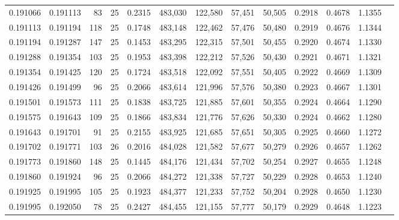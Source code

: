 \begin{tabular}{rrrrrrrrrrrrr}
0.191066 & 0.191113 &    83 &  25 &                                     0.2315 & 483,030 & 122,580 &  57,451 &  50,505 & 0.2918 & 0.4678 & 1.1355 \\
0.191113 & 0.191194 &   118 &  25 &                                     0.1748 & 483,148 & 122,462 &  57,476 &  50,480 & 0.2919 & 0.4676 & 1.1344 \\
0.191194 & 0.191287 &   147 &  25 &                                     0.1453 & 483,295 & 122,315 &  57,501 &  50,455 & 0.2920 & 0.4674 & 1.1330 \\
0.191288 & 0.191354 &   103 &  25 &                                     0.1953 & 483,398 & 122,212 &  57,526 &  50,430 & 0.2921 & 0.4671 & 1.1321 \\
0.191354 & 0.191425 &   120 &  25 &                                     0.1724 & 483,518 & 122,092 &  57,551 &  50,405 & 0.2922 & 0.4669 & 1.1309 \\
0.191426 & 0.191499 &    96 &  25 &                                     0.2066 & 483,614 & 121,996 &  57,576 &  50,380 & 0.2923 & 0.4667 & 1.1301 \\
0.191501 & 0.191573 &   111 &  25 &                                     0.1838 & 483,725 & 121,885 &  57,601 &  50,355 & 0.2924 & 0.4664 & 1.1290 \\
0.191575 & 0.191643 &   109 &  25 &                                     0.1866 & 483,834 & 121,776 &  57,626 &  50,330 & 0.2924 & 0.4662 & 1.1280 \\
0.191643 & 0.191701 &    91 &  25 &                                     0.2155 & 483,925 & 121,685 &  57,651 &  50,305 & 0.2925 & 0.4660 & 1.1272 \\
0.191702 & 0.191771 &   103 &  26 &                                     0.2016 & 484,028 & 121,582 &  57,677 &  50,279 & 0.2926 & 0.4657 & 1.1262 \\
0.191773 & 0.191860 &   148 &  25 &                                     0.1445 & 484,176 & 121,434 &  57,702 &  50,254 & 0.2927 & 0.4655 & 1.1248 \\
0.191860 & 0.191924 &    96 &  25 &                                     0.2066 & 484,272 & 121,338 &  57,727 &  50,229 & 0.2928 & 0.4653 & 1.1240 \\
0.191925 & 0.191995 &   105 &  25 &                                     0.1923 & 484,377 & 121,233 &  57,752 &  50,204 & 0.2928 & 0.4650 & 1.1230 \\
0.191995 & 0.192050 &    78 &  25 &                                     0.2427 & 484,455 & 121,155 &  57,777 &  50,179 & 0.2929 & 0.4648 & 1.1223 \\

\end{tabular}
